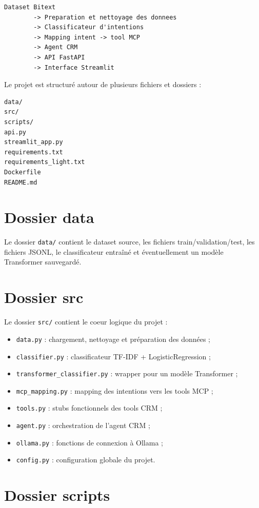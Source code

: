 \documentclass[12pt,a4paper]{report}
\begin{document}
\begin{lstlisting}
Dataset Bitext
        -> Preparation et nettoyage des donnees
        -> Classificateur d'intentions
        -> Mapping intent -> tool MCP
        -> Agent CRM
        -> API FastAPI
        -> Interface Streamlit
\end{lstlisting}

Le projet est structuré autour de plusieurs fichiers et dossiers :

\begin{lstlisting}
data/
src/
scripts/
api.py
streamlit_app.py
requirements.txt
requirements_light.txt
Dockerfile
README.md
\end{lstlisting}

\section{Dossier data}

Le dossier \texttt{data/} contient le dataset source, les fichiers train/validation/test, les fichiers JSONL, le classificateur entraîné et éventuellement un modèle Transformer sauvegardé.

\section{Dossier src}

Le dossier \texttt{src/} contient le coeur logique du projet :

\begin{itemize}
    \item \texttt{data.py} : chargement, nettoyage et préparation des données ;
    \item \texttt{classifier.py} : classificateur TF-IDF + LogisticRegression ;
    \item \texttt{transformer\_classifier.py} : wrapper pour un modèle Transformer ;
    \item \texttt{mcp\_mapping.py} : mapping des intentions vers les tools MCP ;
    \item \texttt{tools.py} : stubs fonctionnels des tools CRM ;
    \item \texttt{agent.py} : orchestration de l'agent CRM ;
    \item \texttt{ollama.py} : fonctions de connexion à Ollama ;
    \item \texttt{config.py} : configuration globale du projet.
\end{itemize}

\section{Dossier scripts}
\end{document}
